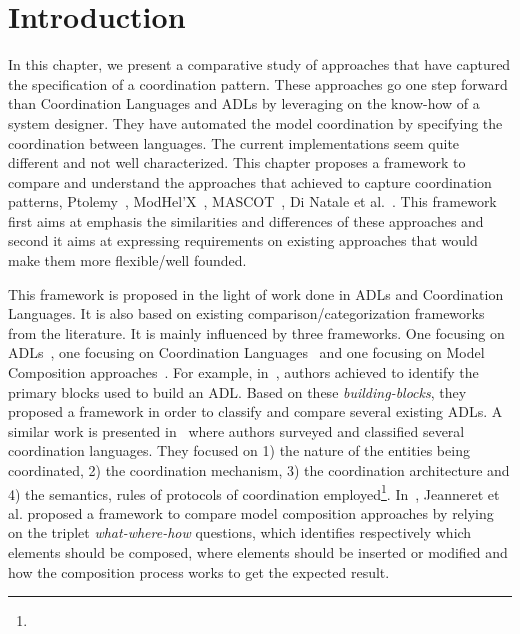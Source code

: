 \section{Introduction}
In this chapter, we present a comparative study of approaches that have captured the specification of a coordination pattern. These approaches go one step forward than Coordination Languages and ADLs by leveraging on the know-how of a system designer. They have automated the model coordination by specifying the coordination between languages. The current implementations seem quite different and not well characterized. This chapter proposes a framework to compare and understand the approaches that achieved to capture coordination patterns, \ie Ptolemy~\cite{ptoleframebib}, ModHel'X~\cite{modhelxbib}, MASCOT~\cite{mascotbib}, Di Natale et al.~\cite{dinatale}. This framework first aims at emphasis the similarities and differences of these approaches and second it aims at expressing requirements on existing approaches that would make them more flexible/well founded.

This framework is proposed in the light of work done in ADLs and Coordination Languages. It is also based on existing comparison/categorization frameworks from the literature. It is mainly influenced by three frameworks. One focusing on ADLs~\cite{frameadlsbib}, one focusing on Coordination Languages~\cite{coordmodels} and one focusing on Model Composition approaches~\cite{framecompoas}. For example, in~\cite{frameadlsbib}, authors achieved to identify the primary blocks used to build an ADL. Based on these \emph{building-blocks}, they proposed a framework in order to classify and compare several existing ADLs. A similar work is presented in~\cite{coordmodels} where authors surveyed and classified several coordination languages. They focused on 1) the nature of the entities being coordinated, 2) the coordination mechanism, 3) the coordination architecture and 4) {\color{red}the semantics, rules of protocols of coordination employed}\footnote{}. In~\cite{framecompoas}, Jeanneret et al. proposed a framework to compare model composition approaches by relying on the triplet \emph{what-where-how} questions, which identifies respectively which elements should be composed, where elements should be inserted or modified and how the composition process works to get the expected result. 



